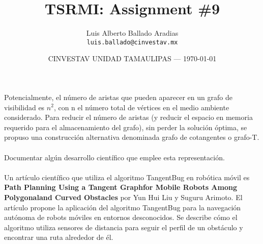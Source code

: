\documentclass{article}
\title{TSRMI: Assignment \#9} %
\author{Luis Alberto Ballado Aradias\\ \texttt{luis.ballado@cinvestav.mx}} %
\date{CINVESTAV UNIDAD TAMAULIPAS --- \today} %
\begin{document}
\maketitle %



Potencialmente, el número de aristas que pueden aparecer en un grafo de visibilidad es $n^{2}$, con n el número total de vértices en el medio ambiente considerado. Para reducir el número de aristas (y reducir el espacio en memoria requerido para el almacenamiento del grafo), sin perder la solución óptima, se propuso una construcción alternativa denominada grafo de cotangentes o grafo-T. \\\\
Documentar algún desarrollo científico que emplee esta representación.\\\\

Un artículo científico que utiliza el algoritmo TangentBug en robótica móvil es \textbf{Path Planning Using a Tangent Graphfor Mobile Robots Among Polygonaland Curved Obstacles} por Yun Hui Liu y Suguru Arimoto. El artículo propone la aplicación del algoritmo TangentBug para la navegación autónoma de robots móviles en entornos desconocidos. Se describe cómo el algoritmo utiliza sensores de distancia para seguir el perfil de un obstáculo y encontrar una ruta alrededor de él.\\
\end{document}
